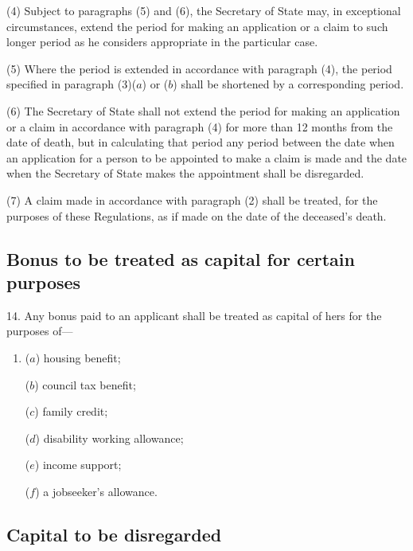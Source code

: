 \documentclass[a4paper]{article}
\begin{document}
(4) Subject to paragraphs (5) and (6), the Secretary of State may, in exceptional circumstances, extend the period for making an application or a claim to such longer period as he considers appropriate in the particular case.

(5) Where the period is extended in accordance with paragraph (4), the period specified in paragraph (3)($a$) or ($b$) shall be shortened by a corresponding period.

(6) The Secretary of State shall not extend the period for making an application or a claim in accordance with paragraph (4) for more than 12 months from the date of death, but in calculating that period any period between the date when an application for a person to be appointed to make a claim is made and the date when the Secretary of State makes the appointment shall be disregarded.

(7) A claim made in accordance with paragraph (2) shall be treated, for the purposes of these Regulations, as if made on the date of the deceased’s death.

\subsection[14. Bonus to be treated as capital for certain purposes]{Bonus to be treated as capital for certain purposes}

14.  Any bonus paid to an applicant shall be treated as capital of hers for the purposes of—
\begin{enumerate}\item[]
($a$) housing benefit;

($b$) council tax benefit;

($c$) family credit;

($d$) disability working allowance;

($e$) income support;

($f$) a jobseeker’s allowance.
\end{enumerate}

\subsection[15. Capital to be disregarded]{Capital to be disregarded}
\end{document}
